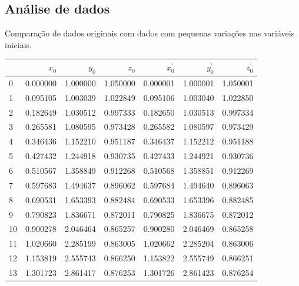 \documentclass[12pt, a4paper]{article}
\begin{document}
\subsection{Análise de dados}
Comparação de dados originais com dados com pequenas variações nas
variáveis iniciais.
\begin{table}[h!]
    \centering
    \begin{tabular}{|l|r|r|r|r|r|r|}
        \hline
           & $x_0$    & $y_0$     & $z_0$    & $x^\prime_0$ & $y^\prime_0$ &
        $z^\prime_0$
        \\
        \hline
        0  & 0.000000 & 1.000000  & 1.050000 & 0.000001     & 1.000001     &
        1.050001
        \\
        1  & 0.095105 & 1.003039  & 1.022849 & 0.095106     & 1.003040     &
        1.022850
        \\
        2  & 0.182649 & 1.030512  & 0.997333 & 0.182650     & 1.030513     &
        0.997334
        \\
        3  & 0.265581 & 1.080595  & 0.973428 & 0.265582     & 1.080597     &
        0.973429
        \\
        4  & 0.346436 & 1.152210  & 0.951187 & 0.346437     & 1.152212     &
        0.951188
        \\
        5  & 0.427432 & 1.244918  & 0.930735 & 0.427433     & 1.244921     &
        0.930736
        \\
        6  & 0.510567 & 1.358849  & 0.912268 & 0.510568     & 1.358851     &
        0.912269
        \\
        7  & 0.597683 & 1.494637  & 0.896062 & 0.597684     & 1.494640     &
        0.896063
        \\
        8  & 0.690531 & 1.653393  & 0.882484 & 0.690533     & 1.653396     &
        0.882485
        \\
        9  & 0.790823 & 1.836671  & 0.872011 & 0.790825     & 1.836675     &
        0.872012
        \\
        10 & 0.900278 & 2.046464  & 0.865257 & 0.900280     & 2.046469     &
        0.865258
        \\
        11 & 1.020660 & 2.285199  & 0.863005 & 1.020662     & 2.285204     &
        0.863006
        \\
        12 & 1.153819 & 2.555743  & 0.866250 & 1.153822     & 2.555749     &
        0.866251
        \\
        13 & 1.301723 & 2.861417  & 0.876253 & 1.301726     & 2.861423     &
        0.876254
        \\

\end{tabular}
\end{table}
\end{document}
